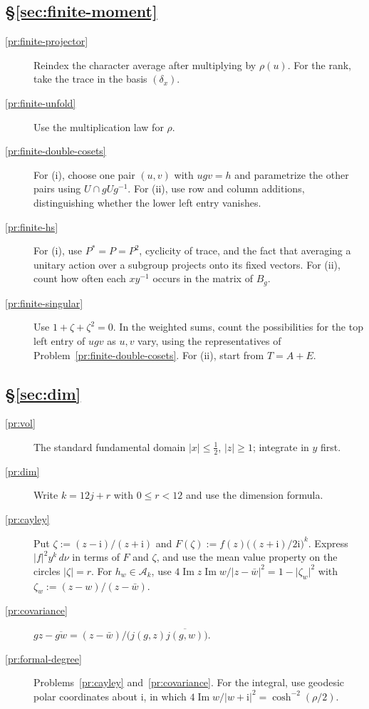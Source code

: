 \documentclass[reqno]{amsart}
\theoremstyle{definition}
\theoremstyle{plain}
\newcommand{\ii}{\mathrm{i}}
\newcommand{\Ac}{\mathcal{A}}
\begin{document}
\subsection*{\S\ref{sec:finite-moment}}
\begin{description}
\item[\ref{pr:finite-projector}] Reindex the character average after multiplying by \(\rho(u)\).  For the rank, take the trace in the basis \((\delta_x)\).
\item[\ref{pr:finite-unfold}] Use the multiplication law for \(\rho\).
\item[\ref{pr:finite-double-cosets}] For (i), choose one pair \((u,v)\) with \(ugv=h\) and parametrize the other pairs using \(U\cap gUg^{-1}\).  For (ii), use row and column additions, distinguishing whether the lower left entry vanishes.
\item[\ref{pr:finite-hs}] For (i), use \(P^*=P=P^2\), cyclicity of trace, and the fact that averaging a unitary action over a subgroup projects onto its fixed vectors.  For (ii), count how often each \(xy^{-1}\) occurs in the matrix of \(B_g\).
\item[\ref{pr:finite-singular}] Use \(1+\zeta+\zeta^2=0\).  In the weighted sums, count the possibilities for the top left entry of \(u g v\) as \(u,v\) vary, using the representatives of Problem~\ref{pr:finite-double-cosets}.  For (ii), start from \(T=A+E\).
\end{description}

\subsection*{\S\ref{sec:dim}}
\begin{description}
\item[\ref{pr:vol}] The standard fundamental domain \(\lvert x\rvert \le \frac12\), \(\lvert z\rvert \ge 1\); integrate in \(y\) first.
\item[\ref{pr:dim}] Write \(k = 12j + r\) with \(0 \le r < 12\) and use the dimension formula.
\item[\ref{pr:cayley}] Put \(\zeta := (z - \ii)/(z + \ii)\) and \(F(\zeta) := f(z)\bigl((z+\ii)/2\ii\bigr)^k\).  Express \(\lvert f\rvert^2 y^k\,d\nu\) in terms of \(F\) and \(\zeta\), and use the mean value property on the circles \(\lvert\zeta\rvert = r\).  For \(h_w \in \Ac_k\), use \(4\operatorname{Im}z\operatorname{Im}w/\lvert z - \bar w\rvert^2 = 1 - \lvert\zeta_w\rvert^2\) with \(\zeta_w := (z - w)/(z - \bar w)\).
\item[\ref{pr:covariance}] \(gz - \overline{gw} = (z - \bar w)/\bigl(j(g,z)\overline{j(g,w)}\bigr)\).
\item[\ref{pr:formal-degree}] Problems~\ref{pr:cayley} and~\ref{pr:covariance}.  For the integral, use geodesic polar coordinates about \(\ii\), in which \(4\operatorname{Im} w/\lvert w + \ii\rvert^2 = \cosh^{-2}(\rho/2)\).
\end{description}
\end{document}
